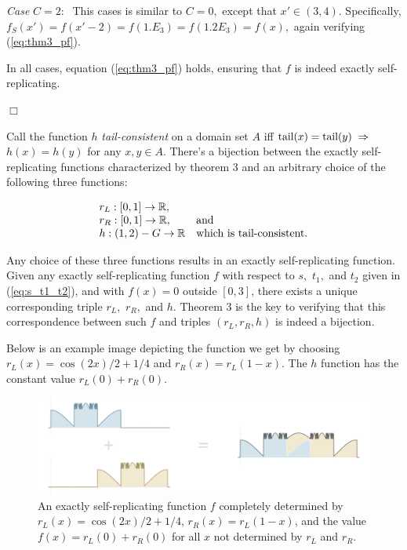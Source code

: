 \documentclass[20pt,]{extarticle}
\begin{document}
\emph{Case} \(C=2:\;\) This cases is similar to \(C=0,\) except that
\(x' \in (3,4).\) Specifically,
\(f_S(x') = f(x'-2) = f(1.E_3) = f(1.2E_3) = f(x),\) again verifying
(\ref{eq:thm3_pf}).

In all cases, equation (\ref{eq:thm3_pf}) holds, ensuring that \(f\) is
indeed exactly self-replicating.

\hfill\(\Box\)

Call the function \(h\) \emph{tail-consistent} on a domain set \(A\) iff
\(\text{tail}(x) = \text{tail}(y) \;\Rightarrow\;\) \(h(x) = h(y)\) for any
\(x,y \in A.\) There's a bijection between the exactly self-replicating
functions characterized by theorem 3 and an arbitrary choice of the
following three functions:

\[\begin{array}{ll}
r_L : [0,1] \to \mathbb{R}, \\
r_R : [0,1] \to \mathbb{R}, & \text{and} \\
h   : (1,2) - G \to \mathbb{R} & \text{which is tail-consistent.}
\end{array}\]

Any choice of these three functions results in an exactly
self-replicating function. Given any exactly self-replicating function
\(f\) with respect to \(s,\) \(t_1,\) and \(t_2\) given in
(\ref{eq:s_t1_t2}), and with \(f(x) = 0\) outside \([0,3]\), there
exists a unique corresponding triple \(r_L,\) \(r_R,\) and \(h\).
Theorem 3 is the key to verifying that this correspondence between such
\(f\) and triples \((r_L, r_R, h)\) is indeed a bijection.

Below is an example image depicting the function we get by choosing
\(r_L(x) = \cos(2x)/2 + 1/4\) and \(r_R(x) = r_L(1-x)\). The \(h\)
function has the constant value \(r_L(0) + r_R(0)\).

\begin{figure}[htbp]
\centering
\includegraphics{images/nonplateau.png}
\caption{\label{fig:nonplateau}An exactly self-replicating function
\(f\) completely determined by \(r_L(x) = \cos(2x)/2 + 1/4\),
\(r_R(x) = r_L(1 - x)\), and the value \(f(x) = r_L(0) + r_R(0)\) for
all \(x\) not determined by \(r_L\) and \(r_R\).}\label{fig:nonplateau}
\end{figure}
\end{document}
